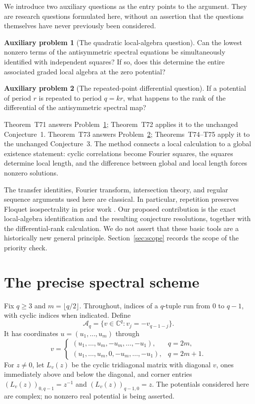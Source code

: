 \documentclass[11pt,a4paper]{article}
\theoremstyle{definition}
\newtheorem{problem}{Auxiliary problem}
\theoremstyle{remark}
\newcommand{\C}{\mathbb C}
\newcommand{\A}{\mathcal A}
\begin{document}
We introduce two auxiliary questions as the entry points to the argument.
They are research questions formulated here, without an assertion that the
questions themselves have never previously been considered.
\begin{problem}[The quadratic local-algebra question]\label{prob:local}
Can the lowest nonzero terms of the antisymmetric spectral equations be
simultaneously identified with independent squares? If so, does this determine
the entire associated graded local algebra at the zero potential?
\end{problem}
\begin{problem}[The repeated-point differential question]\label{prob:repeat}
If a potential of period $r$ is repeated to period $q=kr$, what happens to the
rank of the differential of the antisymmetric spectral map?
\end{problem}

Theorem~T71 answers Problem~\ref{prob:local}; Theorem~T72 applies it to the
unchanged Conjecture~1. Theorem~T73 answers Problem~\ref{prob:repeat};
Theorems~T74--T75 apply it to the unchanged Conjecture~3. The method connects a
local calculation to a global existence statement: cyclic correlations become
Fourier squares, the squares determine local length, and the difference between
global and local length forces nonzero solutions.

The transfer identities, Fourier transform, intersection theory, and regular
sequence arguments used here are classical. In particular, repetition preserves
Floquet isospectrality in prior work \cite[Section~4.2, equation~(12)]{CFK}.
Our proposed contribution is the exact local-algebra identification and the
resulting conjecture resolutions, together with the differential-rank
calculation. We do not assert that these basic tools are a historically new
general principle. Section~\ref{sec:scope} records the scope of the priority check.

\section{The precise spectral scheme}

Fix $q\geq3$ and $m=\lfloor q/2\rfloor$. Throughout, indices of a $q$-tuple
run from $0$ to $q-1$, with cyclic indices when indicated. Define
\[
 \A_q=\{v\in\C^q:v_j=-v_{q-1-j}\}.
\]
It has coordinates $u=(u_1,\ldots,u_m)$ through
\[
v=\begin{cases}
(u_1,\ldots,u_m,-u_m,\ldots,-u_1),&q=2m,\\
(u_1,\ldots,u_m,0,-u_m,\ldots,-u_1),&q=2m+1.
\end{cases}
\]
For $z\ne0$, let $L_v(z)$ be the cyclic tridiagonal matrix with diagonal $v$,
ones immediately above and below the diagonal, and corner entries
$(L_v(z))_{0,q-1}=z^{-1}$ and $(L_v(z))_{q-1,0}=z$.
The potentials considered here are complex; no nonzero real potential is
being asserted.
\end{document}
